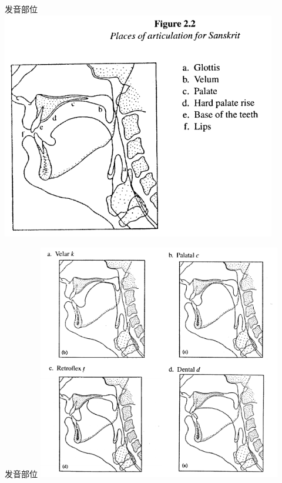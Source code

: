 \documentclass[17pt]{beamer}
\begin{document}
\begin{frame}{发音部位}
  \centering    
  \includegraphics[width=0.9\textwidth]{placeofarticulation.png}
\end{frame}

\begin{frame}{发音部位}
  \centering    
  \includegraphics[width=0.8\textwidth]{placeofarticulation4varga.png}
\end{frame}
\end{document}
